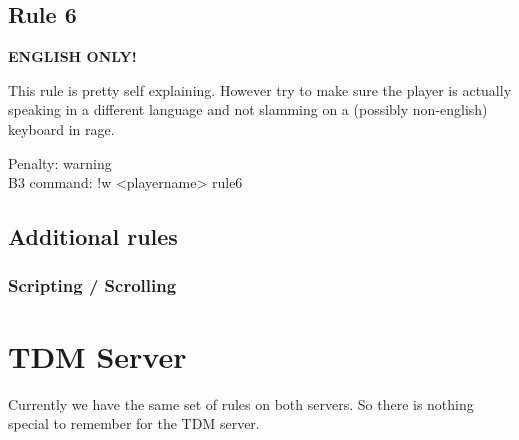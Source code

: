 \subsection*{Rule 6}
\label{rules:sd:6}
\textbf{ENGLISH ONLY!}

This rule is pretty self explaining. However try to make sure the player is actually speaking in a different language and not slamming on a (possibly non-english) keyboard in rage.

\begin{addmargin}[2em]{4em}
Penalty: warning \\
B3 command: !w <playername> rule6
\end{addmargin}

\subsection*{Additional rules}
\subsubsection{Scripting / Scrolling}


\section{TDM Server}
Currently we have the same set of rules on both servers. So there is nothing special to remember for the TDM server.
